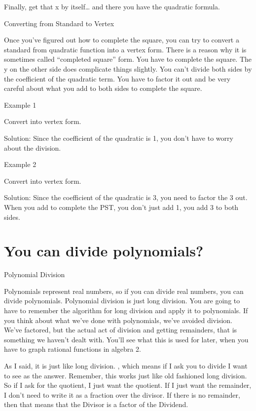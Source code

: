 Finally, get that x by itself\ldots{} and there you have the quadratic formula.


Converting from Standard to Vertex

Once you've figured out how to complete the square, you can try to convert a standard from quadratic function into a vertex form. There is a reason why it is sometimes called ``completed square'' form. You have to complete the square. The y on the other side does complicate things slightly. You can't divide both sides by the coefficient of the quadratic term. You have to factor it out and be very careful about what you add to both sides to complete the square.

Example 1

Convert into vertex form. 

Solution:
Since the coefficient of the quadratic is 1, you don't have to worry about the division.


Example 2

Convert into vertex form. 

Solution:
Since the coefficient of the quadratic is 3, you need to factor the 3 out. When you add to complete the PST, you don't just add 1, you add 3 to both sides.



\section{You can divide polynomials?}

Polynomial Division

Polynomials represent real numbers, so if you can divide real numbers, you can divide polynomials. Polynomial division is just long division. You are going to have to remember the algorithm for long division and apply it to polynomials. If you think about what we've done with polynomials, we've avoided division. We've factored, but the actual act of division and getting remainders, that is something we haven't dealt with. You'll see what this is used for later, when you have to graph rational functions in algebra 2.

As I said, it is just like long division. , which means if I ask you to divide I want to see as the answer. Remember, this works just like old fashioned long division. So if I ask for the quotient, I just want the quotient. If I just want the remainder, I don't need to write it as a fraction over the divisor. If there is no remainder, then that means that the Divisor is a factor of the Dividend. 

